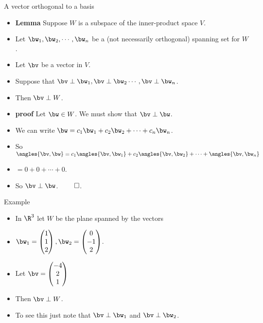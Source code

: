 \documentclass{beamer}
\begin{document}
\begin{frame}{A vector orthogonal to a basis}
\begin{itemize}
\item \textbf{Lemma} Suppose $W$ is a subspace of the inner-product space $V$.
\item Let $\bw_1,\bw_2,\cdots,\bw_n$ be a (not necessarily orthogonal) spanning set for $W$.
\item Let $\bv$ be a vector in $V$.
\item Suppose that $\bv\perp\bw_1,\bv\perp\bw_2\cdots,\bv\perp\bw_n$.
\item Then $\bv\perp W$.
\item \textbf{proof} Let $\bw\in W$. We must show that $\bv\perp\bw$.
\item We can write $\bw=c_1\bw_1+c_2\bw_2+\cdots+c_n\bw_n$.
\item So $\angles{\bv,\bw} = c_1\angles{\bv,\bw_1} + c_2\angles{\bv,\bw_2}+\cdots+\angles{\bv,\bw_n}$
\item $=0 + 0 + \cdots + 0$.
\item So $\bv\perp\bw$. $\qed$.
\end{itemize}
\end{frame}
\begin{frame}{Example}
\begin{itemize}
\item In $\R^3$ let $W$ be the plane spanned by the vectors
\item $\bw_1=
\begin{pmatrix}
1 \\ 1 \\ 2
\end{pmatrix},
\bw_2=
\begin{pmatrix}
0 \\ -1 \\ 2
\end{pmatrix}
$.
\item Let $\bv=
\begin{pmatrix}
-4 \\ 2 \\ 1
\end{pmatrix}
$
\item Then $\bv\perp W$.
\item To see this just note that $\bv\perp\bw_1$ and $\bv\perp\bw_2$.
\end{itemize}
\end{frame}
\end{document}
